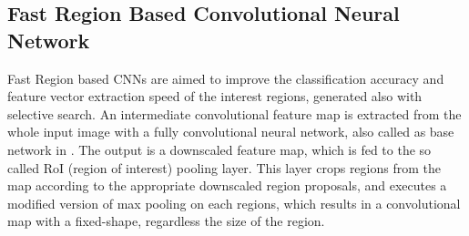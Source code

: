 \subsection{Fast Region Based Convolutional Neural Network}\label{s:c-fastrcnn}
Fast Region based CNNs \cite{Girshick:2016:RCN:2881668.2882239} are aimed to improve the classification accuracy and feature vector extraction speed of the interest regions, generated also with selective search. An intermediate convolutional feature map is extracted from the whole input image with a fully convolutional neural network, also called as base network in \citep{journals/corr/SermanetEZMFL13}. The output is a downscaled feature map, which is fed to the so called RoI (region of interest) pooling layer. This layer crops regions from the map according to the appropriate downscaled region proposals, and executes a modified version of max pooling on each regions, which results in a convolutional map with a fixed-shape, regardless the size of the region.

